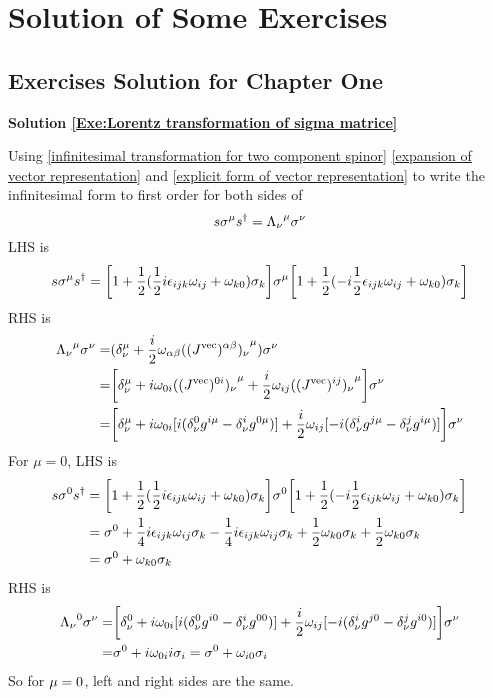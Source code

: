 \chapter{Solution of Some Exercises}


 \section{Exercises Solution for Chapter One}
 
 \noindent\textbf{Solution \ref{Exe:Lorentz transformation of sigma matrice}}
 
 Using \eqref{infinitesimal transformation for two component spinor} \eqref{expansion of vector representation} and 
 \eqref{explicit form of vector representation} to write the infinitesimal form to first order for both sides of 
 \begin{equation}
 s\sigma^{\mu}s^{\dagger} = {\Lambda_\nu}^\mu \sigma^\nu
 \end{equation} 
 LHS is  
 \begin{align}
 s\sigma^{\mu}s^{\dagger} = \bigg[1+\frac{1}{2}(\frac{1}{2} i \epsilon_{ijk}\omega_{ij}+\omega_{k0})\sigma_k\bigg]\sigma^{\mu}\bigg[1+\frac{1}{2}(-i\frac{1}{2} \epsilon_{ijk}\omega_{ij}+\omega_{k0})\sigma_k\bigg]
 \end{align}
 RHS is
 \begin{align}
 {\Lambda_\nu}^\mu \sigma^\nu =& (\delta_\nu^\mu + \frac{i}{2}\omega_{\alpha\beta}{((J^\text{vec})^{\alpha\beta})_\nu}^\mu)\sigma^{\nu}
 \notag\\
 =& \bigg[\delta_\nu^\mu + 
 i\omega_{0i}{((J^\text{vec})^{0i})_\nu}^\mu+
 \frac{i}{2}\omega_{ij}{((J^\text{vec})^{ij})_\nu}^\mu
 \bigg]\sigma^{\nu}\notag\\
 =& \bigg[\delta_\nu^\mu + 
 i\omega_{0i}[i(\delta^0_\nu g^{i\mu}-\delta^i_\nu g^{0\mu})]+
 \frac{i}{2}\omega_{ij}[-i(\delta^i_\nu g^{j\mu}-\delta^j_\nu g^{i\mu})]
 \bigg]\sigma^{\nu}
 \end{align}
 For $\mu = 0$, LHS is
 \begin{align}
  s\sigma^{0}s^{\dagger} &= \bigg[1+\frac{1}{2}(\frac{1}{2} i \epsilon_{ijk}\omega_{ij}+\omega_{k0})\sigma_k\bigg]\sigma^{0}\bigg[1+\frac{1}{2}(-i\frac{1}{2} \epsilon_{ijk}\omega_{ij}+\omega_{k0})\sigma_k\bigg]\notag\\
  &= \sigma^0 
  +\frac{1}{4}i\epsilon_{ijk}\omega_{ij}\sigma_k
  -\frac{1}{4}i\epsilon_{ijk}\omega_{ij}\sigma_k
  +\frac{1}{2}\omega_{k0}\sigma_k+\frac{1}{2}\omega_{k0}\sigma_k
  \notag\\
  &=\sigma^0 +\omega_{k0}\sigma_k
 \end{align}
 RHS is
 \begin{align}
   {\Lambda_\nu}^0 \sigma^\nu 
   =& \bigg[\delta_\nu^0 + 
   i\omega_{0i}[i(\delta^0_\nu g^{i0}-\delta^i_\nu g^{00})]+
   \frac{i}{2}\omega_{ij}[-i(\delta^i_\nu g^{j0}-\delta^j_\nu g^{i0})]
   \bigg]\sigma^{\nu}\notag\\
   =& \sigma^0 +i\omega_{0i}i\sigma_{i}=\sigma^{0}+\omega_{i0}\sigma_i
 \end{align}
 So for $\mu = 0$, left and right sides are the same. 
 
